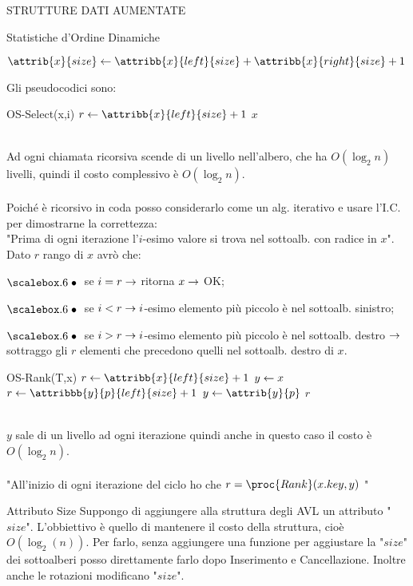 \documentclass[8pt]{extarticle}
\begin{document}
\begin{formulario}
\begin{myParagraph}{STRUTTURE DATI AUMENTATE}
\begin{subParagraph}{Statistiche d'Ordine Dinamiche}
			\begin{tcenter}
			$\attrib{x}{size}\get\attribb{x}{left}{size}+\attribb{x}{right}{size}+1$
			\end{tcenter}
Gli pseudocodici sono:
			\begin{code}{OS-Select(x,i)}
\li $r\get \attribb{x}{left}{size} +1$ 
\li {}
	\li \RETURN $x$
\li {}
	\li \RETURN {}
\li \ELSE
\li \RETURN {}
\END
			\end{code}	
\\
Ad ogni chiamata ricorsiva scende di un livello nell'albero, che ha $O(\log_2 n)$ livelli, quindi il costo complessivo è $O(\log_2 n)$.\\
\\
Poiché è ricorsivo in coda posso considerarlo come un alg. iterativo e usare l'I.C. per dimostrarne la correttezza:\\
"Prima di ogni iterazione l'$i$-esimo valore si trova nel sottoalb. con radice in $x$".\\
Dato $r$ rango di $x$ avrò che:
			\begin{descr}{1}
				\item[$\scalare$] se $i=r \rightarrow$ ritorna $x\rightarrow$ OK;
				\item[$\scalare$] se $i<r \rightarrow i$-esimo elemento più piccolo è nel sottoalb. sinistro;  
				\item[$\scalare$] se $i>r \rightarrow i$-esimo elemento più piccolo è nel sottoalb. destro $\rightarrow$ sottraggo gli $r$ elementi che precedono quelli nel sottoalb. destro di $x$.
			\end{descr}
			\begin{code}{OS-Rank(T,x)}
\li $r\get\attribb{x}{left}{size}+1$
\li $y\leftarrow x$
\li {}
	\li {}
		\li $r\get\attribbb{y}{p}{left}{size}+1$
	\END
	\li $y\get\attrib{y}{p}$
\END
\li \RETURN $r$
			\end{code}
\\
$y$ sale di un livello ad ogni iterazione quindi anche in questo caso il costo è $O(\log_2 n)$.\\
\\
"All'inizio di ogni iterazione del ciclo ho che $r=\proc{Rank}(x.key,y)$ "
		\end{subParagraph}
		\begin{subParagraph}{Attributo Size}
Suppongo di aggiungere alla struttura degli AVL un attributo "$size$". L'obbiettivo è quello di mantenere il costo della struttura, cioè $O(\log_2(n))$. Per farlo, senza aggiungere una funzione per aggiustare la "$size$" dei sottoalberi posso direttamente farlo dopo Inserimento e Cancellazione. Inoltre anche le rotazioni modificano "$size$".

\end{subParagraph}
\end{myParagraph}
\end{formulario}
\end{document}

